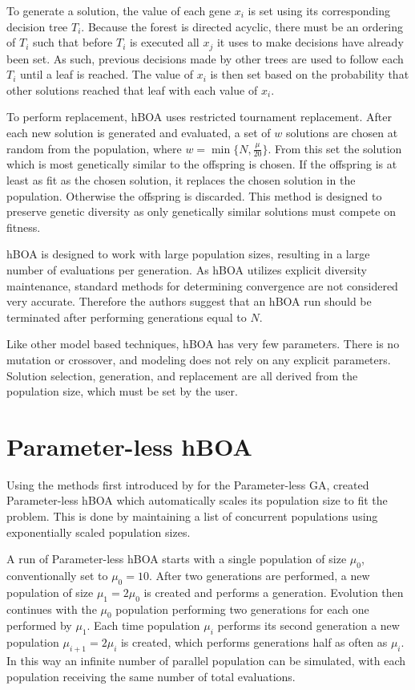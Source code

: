 To generate a solution, the value of each gene $x_i$ is set using its corresponding decision tree $T_i$. Because
the forest is directed acyclic, there must be an ordering of $T_i$ such that before $T_i$ is executed all
$x_j$ it uses to make decisions have already been set. As such, previous decisions made by other trees
are used to follow each $T_i$ until a leaf is reached. The value of $x_i$ is then set based on the
probability that other solutions reached that leaf with each value of $x_i$.

To perform replacement, hBOA uses restricted tournament replacement. After each new solution is generated
and evaluated, a set of $w$ solutions are chosen at random from the population, where $w=\min\{N, \frac{\mu}{20}\}$.
From this set the solution which is most genetically similar to the offspring is chosen. If the offspring
is at least as fit as the chosen solution, it replaces the chosen solution in the population. Otherwise the
offspring is discarded. This method is designed to preserve genetic diversity as only genetically similar
solutions must compete on fitness.

hBOA is designed to work with large population sizes, resulting in a large number of
evaluations per generation. As hBOA utilizes explicit diversity maintenance, standard methods for determining
convergence are not considered very accurate. Therefore the authors suggest that an hBOA run should be
terminated after performing generations equal to $N$.

Like other model based techniques, hBOA has very few parameters. There is no mutation or crossover,
and modeling does not rely on any explicit parameters. Solution selection, generation, and replacement
are all derived from the population size, which must be set by the user.

\section{Parameter-less hBOA}
Using the methods first introduced by \cite{harik:1999:parameterlessga} for the Parameter-less GA,
\cite{pelikan:2004:parameterlesshboa} created Parameter-less hBOA which automatically scales its
population size to fit the problem. This is done by maintaining a list of concurrent populations
using exponentially scaled population sizes.

A run of Parameter-less hBOA starts with a single population of size $\mu_0$, conventionally set
to $\mu_0=10$. After two generations are performed, a new population of size $\mu_1 = 2\mu_0$ is created
and performs a generation. Evolution then continues with the $\mu_0$ population performing two generations
for each one performed by $\mu_1$. Each time population $\mu_i$ performs its second generation a new population
$\mu_{i+1}=2\mu_i$ is created, which performs generations half as often as $\mu_i$. In this way an infinite number of
parallel population can be simulated, with each population receiving the same number of total evaluations.

